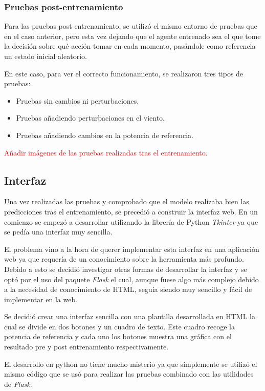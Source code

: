 \subsubsection{Pruebas post-entrenamiento}

Para las pruebas post entrenamiento, se utilizó el mismo entorno de pruebas que en el caso anterior, pero esta vez dejando que el agente entrenado sea el que tome la decisión sobre qué acción tomar en cada momento, pasándole como referencia un estado inicial aleatorio.

En este caso, para ver el correcto funcionamiento, se realizaron tres tipos de pruebas:

\begin{itemize}
    \item Pruebas sin cambios ni perturbaciones.
    \item Pruebas añadiendo perturbaciones en el viento.
    \item Pruebas añadiendo cambios en la potencia de referencia.
\end{itemize}

\textcolor{red}{Añadir imágenes de las pruebas realizadas tras el entrenamiento.}

\subsection{Interfaz}

Una vez realizadas las pruebas y comprobado que el modelo realizaba bien las predicciones tras el entrenamiento, se precedió a construir la interfaz web.
En un comienzo se empezó a desarrollar utilizando la librería de Python \textit{Tkinter} ya que se pedía una interfaz muy sencilla.

El problema vino a la hora de querer implementar esta interfaz en una aplicación web ya que requería de un conocimiento sobre la herramienta más profundo. Debido a esto se decidió investigar otras formas de desarrollar la interfaz y se optó por el uso del paquete \textit{Flask} el cual, aunque fuese algo más complejo debido a la necesidad de conocimiento de HTML, seguía siendo muy sencillo y fácil de implementar en la web.

Se decidió crear una interfaz sencilla con una plantilla desarrollada en HTML la cual se divide en dos botones y un cuadro de texto. Este cuadro recoge la potencia de referencia y cada uno los botones muestra una gráfica con el resultado pre y post entrenamiento respectivamente.

El desarrollo en python no tiene mucho misterio ya que simplemente se utilizó el mismo código que se usó para realizar las pruebas combinado con las utilidades de \textit{Flask}.